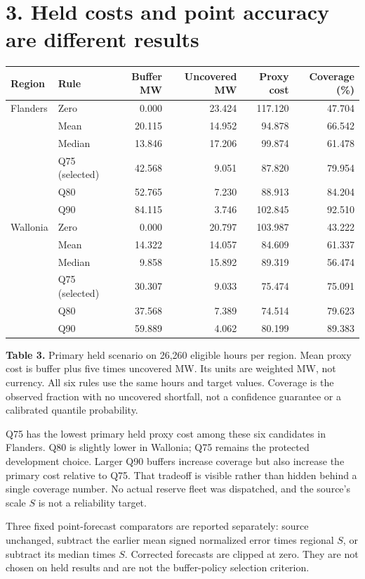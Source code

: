 \documentclass[10pt,letterpaper]{article}
\begin{document}
\section*{3. Held costs and point accuracy are different results}
\begin{center}\scriptsize\begin{tabular}{llrrrr}\toprule
Region & Rule & Buffer MW & Uncovered MW & Proxy cost & Coverage (\%)\\\midrule
Flanders & Zero & 0.000 & 23.424 & 117.120 & 47.704 \\
 & Mean & 20.115 & 14.952 & 94.878 & 66.542 \\
 & Median & 13.846 & 17.206 & 99.874 & 61.478 \\
 & Q75 (selected) & 42.568 & 9.051 & 87.820 & 79.954 \\
 & Q80 & 52.765 & 7.230 & 88.913 & 84.204 \\
 & Q90 & 84.115 & 3.746 & 102.845 & 92.510 \\
Wallonia & Zero & 0.000 & 20.797 & 103.987 & 43.222 \\
 & Mean & 14.322 & 14.057 & 84.609 & 61.337 \\
 & Median & 9.858 & 15.892 & 89.319 & 56.474 \\
 & Q75 (selected) & 30.307 & 9.033 & 75.474 & 75.091 \\
 & Q80 & 37.568 & 7.389 & 74.514 & 79.623 \\
 & Q90 & 59.889 & 4.062 & 80.199 & 89.383 \\
\bottomrule\end{tabular}\end{center}
\textbf{Table 3.} Primary held scenario on 26,260 eligible hours per region. Mean proxy cost is buffer plus five times uncovered MW. Its units are weighted MW, not currency. All six rules use the same hours and target values. Coverage is the observed fraction with no uncovered shortfall, not a confidence guarantee or a calibrated quantile probability.

Q75 has the lowest primary held proxy cost among these six candidates in Flanders. Q80 is slightly lower in Wallonia; Q75 remains the protected development choice. Larger Q90 buffers increase coverage but also increase the primary cost relative to Q75. That tradeoff is visible rather than hidden behind a single coverage number. No actual reserve fleet was dispatched, and the source's scale $S$ is not a reliability target.

Three fixed point-forecast comparators are reported separately: source unchanged, subtract the earlier mean signed normalized error times regional $S$, or subtract its median times $S$. Corrected forecasts are clipped at zero. They are not chosen on held results and are not the buffer-policy selection criterion.
\end{document}
